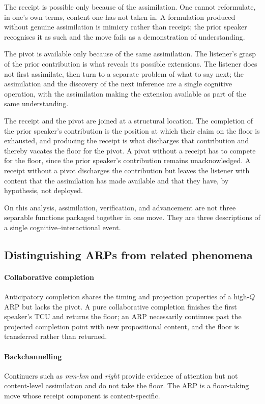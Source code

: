 The receipt is possible only because of the assimilation. One cannot reformulate, in one's own terms, content one has not taken in. A formulation produced without genuine assimilation is mimicry rather than receipt; the prior speaker recognises it as such and the move fails as a demonstration of understanding.

The pivot is available only because of the same assimilation. The listener's grasp of the prior contribution is what reveals its possible extensions. The listener does not first assimilate, then turn to a separate problem of what to say next; the assimilation and the discovery of the next inference are a single cognitive operation, with the assimilation making the extension available as part of the same understanding.

The receipt and the pivot are joined at a structural location. The completion of the prior speaker's contribution is the position at which their claim on the floor is exhausted, and producing the receipt is what discharges that contribution and thereby vacates the floor for the pivot. A pivot without a receipt has to compete for the floor, since the prior speaker's contribution remains unacknowledged. A receipt without a pivot discharges the contribution but leaves the listener with content that the assimilation has made available and that they have, by hypothesis, not deployed.

On this analysis, assimilation, verification, and advancement are not three separable functions packaged together in one move. They are three descriptions of a single cognitive--interactional event.

\subsection{Distinguishing ARPs from related phenomena}

\paragraph{Collaborative completion} Anticipatory completion \citep{Lerner1991} shares the timing and projection properties of a high-$Q$ ARP but lacks the pivot. A pure collaborative completion finishes the first speaker's TCU and returns the floor; an ARP necessarily continues past the projected completion point with new propositional content, and the floor is transferred rather than returned.

\paragraph{Backchannelling} Continuers such as \emph{mm-hm} and \emph{right} \citep{Schegloff1982} provide evidence of attention but not content-level assimilation and do not take the floor. The ARP is a floor-taking move whose receipt component is content-specific.

